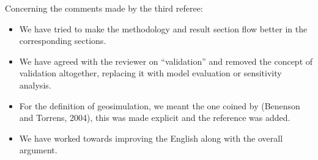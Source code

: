 \documentclass[11pt,a4paper,sans]{moderncv}        %
\begin{document}
Concerning the comments made by the third referee:


\begin{itemize}
	\item We have tried to make the methodology and result section flow better in the corresponding sections.
	
	\item We have agreed with the reviewer on ``validation'' and removed the concept of validation altogether, replacing it with model evaluation or sensitivity analysis.
	
	\item For the definition of geosimulation, we meant the one coined by (Benenson and Torrens, 2004), this was made explicit and the reference was added. 
    	
	\item We have worked towards improving the English along with the overall argument. 
	

\end{itemize}
\end{document}
